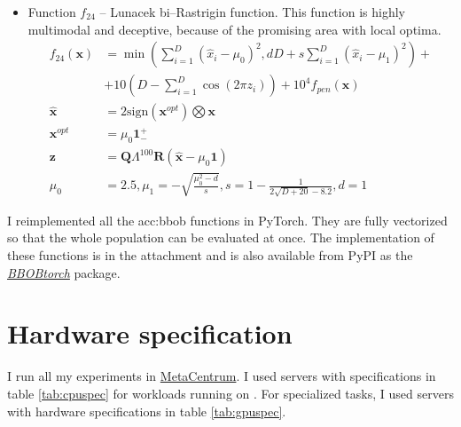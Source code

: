 \begin{itemize}
\begin{align*}
\begin{array}{ll}
\begin{array}{l}
                    \end{array}
            \end{array}
        \right.
    \end{align*}
    \item Function $f_{24}$ -- Lunacek bi--Rastrigin function. This function is highly multimodal and deceptive, because of the promising area with local optima.
    \begin{align*}
        f_{24}\left(\mathbf{x}\right) &=
            \min\left( \sum_{i=1}^D\left(\hat{x}_i-\mu_0\right)^2, dD+s\sum_{i=1}^D\left(\hat{x}_i-\mu_1\right)^2 \right) + \\
            &+ 10\left(D-\sum_{i=1}^D \cos\left(2\pi z_i\right)\right)
            + 10^4 f_{pen}\left(\mathbf{x}\right) \\
        \hat{\mathbf{x}} &= 2 \text{sign}\left(\mathbf{x}^{opt}\right) \bigotimes \mathbf{x} \\
        \mathbf{x}^{opt} &= \mu_0 \mathbf{1}^{+}_{-} \\
        \mathbf{z} &= \mathbf{Q}\Lambda^{100}\mathbf{R}\left(\hat{\mathbf{x}}-\mu_0\mathbf{1}\right) \\
        \mu_0&=2.5,\mu_1=-\sqrt{\frac{\mu_0^2-d}{s}}, s=1-\frac{1}{2\sqrt{D+20}-8.2},d=1
    \end{align*}
\end{itemize}

I reimplemented all the \acrshort{acc:bbob} functions in PyTorch. They are fully vectorized so that the whole population can be evaluated at once. The implementation of these functions is in the attachment and is also available from PyPI as the \href{https://pypi.org/project/BBOBtorch/}{\textit{BBOBtorch}} package.




\section{Hardware specification}

I run all my experiments in \href{https://metavo.metacentrum.cz/en/}{MetaCentrum}. I used servers with specifications in table \ref{tab:cpuspec} for workloads running on \cpuns. For \gpu specialized tasks, I used servers with hardware specifications in table \ref{tab:gpuspec}.


